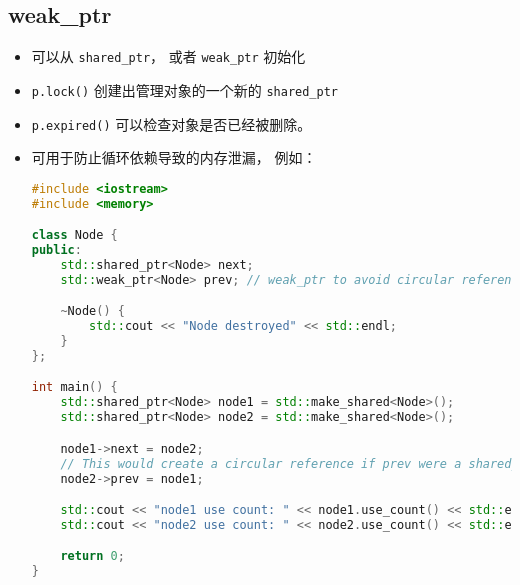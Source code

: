 \subsection{weak\_ptr}
\begin{itemize}
\item 可以从 \verb`shared_ptr`， 或者 \verb`weak_ptr` 初始化
\item \verb`p.lock()` 创建出管理对象的一个新的 \verb`shared_ptr`
\item \verb`p.expired()` 可以检查对象是否已经被删除。
\item 可用于防止循环依赖导致的内存泄漏， 例如：
\begin{lstlisting}[language=cpp]
#include <iostream>
#include <memory>

class Node {
public:
    std::shared_ptr<Node> next;
    std::weak_ptr<Node> prev; // weak_ptr to avoid circular reference

    ~Node() {
        std::cout << "Node destroyed" << std::endl;
    }
};

int main() {
    std::shared_ptr<Node> node1 = std::make_shared<Node>();
    std::shared_ptr<Node> node2 = std::make_shared<Node>();

    node1->next = node2;
    // This would create a circular reference if prev were a shared_ptr
    node2->prev = node1;

    std::cout << "node1 use count: " << node1.use_count() << std::endl;  // 1
    std::cout << "node2 use count: " << node2.use_count() << std::endl;  // 2

    return 0;
}
\end{lstlisting}
\end{itemize}
